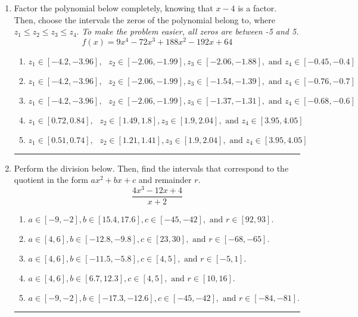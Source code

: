 \documentclass[14pt]{extbook}
\newcommand{\litem}[1]{\item#1\hspace*{-1cm}\rule{\textwidth}{0.4pt}}
\begin{document}
\begin{enumerate}
{\begin{enumerate}[label=\Alph*.]
\end{enumerate} }
\litem{
Factor the polynomial below completely, knowing that $x-4$ is a factor. Then, choose the intervals the zeros of the polynomial belong to, where $z_1 \leq z_2 \leq z_3 \leq z_4$. \textit{To make the problem easier, all zeros are between -5 and 5.}\[ f(x) = 9x^{4} -72 x^{3} +188 x^{2} -192 x + 64 \]\begin{enumerate}[label=\Alph*.]
\item \( z_1 \in [-4.2, -3.96], \text{   }  z_2 \in [-2.06, -1.99], z_3 \in [-2.06, -1.88], \text{   and   } z_4 \in [-0.45, -0.4] \)
\item \( z_1 \in [-4.2, -3.96], \text{   }  z_2 \in [-2.06, -1.99], z_3 \in [-1.54, -1.39], \text{   and   } z_4 \in [-0.76, -0.7] \)
\item \( z_1 \in [-4.2, -3.96], \text{   }  z_2 \in [-2.06, -1.99], z_3 \in [-1.37, -1.31], \text{   and   } z_4 \in [-0.68, -0.6] \)
\item \( z_1 \in [0.72, 0.84], \text{   }  z_2 \in [1.49, 1.8], z_3 \in [1.9, 2.04], \text{   and   } z_4 \in [3.95, 4.05] \)
\item \( z_1 \in [0.51, 0.74], \text{   }  z_2 \in [1.21, 1.41], z_3 \in [1.9, 2.04], \text{   and   } z_4 \in [3.95, 4.05] \)

\end{enumerate} }
\litem{
Perform the division below. Then, find the intervals that correspond to the quotient in the form $ax^2+bx+c$ and remainder $r$.\[ \frac{4x^{3} -12 x + 4}{x + 2} \]\begin{enumerate}[label=\Alph*.]
\item \( a \in [-9, -2], b \in [15.4, 17.6], c \in [-45, -42], \text{ and } r \in [92, 93]. \)
\item \( a \in [4, 6], b \in [-12.8, -9.8], c \in [23, 30], \text{ and } r \in [-68, -65]. \)
\item \( a \in [4, 6], b \in [-11.5, -5.8], c \in [4, 5], \text{ and } r \in [-5, 1]. \)
\item \( a \in [4, 6], b \in [6.7, 12.3], c \in [4, 5], \text{ and } r \in [10, 16]. \)
\item \( a \in [-9, -2], b \in [-17.3, -12.6], c \in [-45, -42], \text{ and } r \in [-84, -81]. \)

\end{enumerate} }
\end{enumerate}
\end{document}
